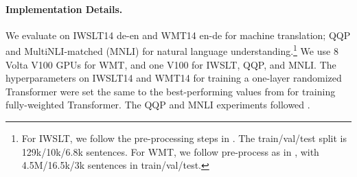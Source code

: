 \paragraph{Implementation Details.} We evaluate on IWSLT14 de-en \citep{Cettolo:2015ReportOT} and WMT14 en-de \citep{bojar:2014-findings} for machine translation; QQP \citep{iyer2017qqp} and MultiNLI-matched (MNLI) \citep{Williams2017mnli} for natural language understanding.\footnote{For IWSLT, we follow the pre-processing steps in \citet{edunov:2018classical}. The train/val/test split is 129k/10k/6.8k sentences. 
For WMT, we follow pre-process as in \citet{Ott:2018scaling}, with 4.5M/16.5k/3k sentences in train/val/test.} 
We use 8 Volta V100 GPUs for WMT, and one V100 for IWSLT, QQP, and MNLI. The hyperparameters on IWSLT14 and WMT14 for training a one-layer randomized Transformer were set the same to the best-performing values from \citet{Ott:2018scaling} for training fully-weighted Transformer. The QQP and MNLI experiments followed \citet{Liu:2019roberta}. 







